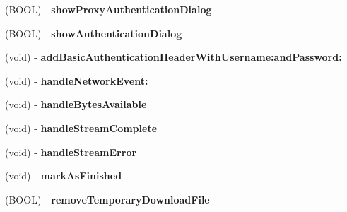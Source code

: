 \begin{DoxyCompactItemize}
\item 
\hypertarget{interface_a_s_i_h_t_t_p_request_ad9c4b7b0abc790e74806860c6d7a7a5b}{
(\-B\-O\-O\-L) -\/ {\bfseries show\-Proxy\-Authentication\-Dialog}}
\label{interface_a_s_i_h_t_t_p_request_ad9c4b7b0abc790e74806860c6d7a7a5b}

\item 
\hypertarget{interface_a_s_i_h_t_t_p_request_a64d812546f152b29ddd614938ffa5539}{
(\-B\-O\-O\-L) -\/ {\bfseries show\-Authentication\-Dialog}}
\label{interface_a_s_i_h_t_t_p_request_a64d812546f152b29ddd614938ffa5539}

\item 
\hypertarget{interface_a_s_i_h_t_t_p_request_a0295b7fbbc9af2be76f9dfe06f75f1ca}{
(void) -\/ {\bfseries add\-Basic\-Authentication\-Header\-With\-Username\-:and\-Password\-:}}
\label{interface_a_s_i_h_t_t_p_request_a0295b7fbbc9af2be76f9dfe06f75f1ca}

\item 
\hypertarget{interface_a_s_i_h_t_t_p_request_a271ec6e669cafa5063866022fb3577ba}{
(void) -\/ {\bfseries handle\-Network\-Event\-:}}
\label{interface_a_s_i_h_t_t_p_request_a271ec6e669cafa5063866022fb3577ba}

\item 
\hypertarget{interface_a_s_i_h_t_t_p_request_aefae44a699dc9e70b78930322cfb3558}{
(void) -\/ {\bfseries handle\-Bytes\-Available}}
\label{interface_a_s_i_h_t_t_p_request_aefae44a699dc9e70b78930322cfb3558}

\item 
\hypertarget{interface_a_s_i_h_t_t_p_request_aaf27f7d11cd1194d5087db56cc553d89}{
(void) -\/ {\bfseries handle\-Stream\-Complete}}
\label{interface_a_s_i_h_t_t_p_request_aaf27f7d11cd1194d5087db56cc553d89}

\item 
\hypertarget{interface_a_s_i_h_t_t_p_request_ab792c755bbcec55490688d2b5aa729ec}{
(void) -\/ {\bfseries handle\-Stream\-Error}}
\label{interface_a_s_i_h_t_t_p_request_ab792c755bbcec55490688d2b5aa729ec}

\item 
\hypertarget{interface_a_s_i_h_t_t_p_request_a0b812d27bc2a7ad7715e6d890923426e}{
(void) -\/ {\bfseries mark\-As\-Finished}}
\label{interface_a_s_i_h_t_t_p_request_a0b812d27bc2a7ad7715e6d890923426e}

\item 
\hypertarget{interface_a_s_i_h_t_t_p_request_a0e68fd4f22a1b5cdcfb3e63a3cdacde9}{
(\-B\-O\-O\-L) -\/ {\bfseries remove\-Temporary\-Download\-File}}
\label{interface_a_s_i_h_t_t_p_request_a0e68fd4f22a1b5cdcfb3e63a3cdacde9}


\end{DoxyCompactItemize}
